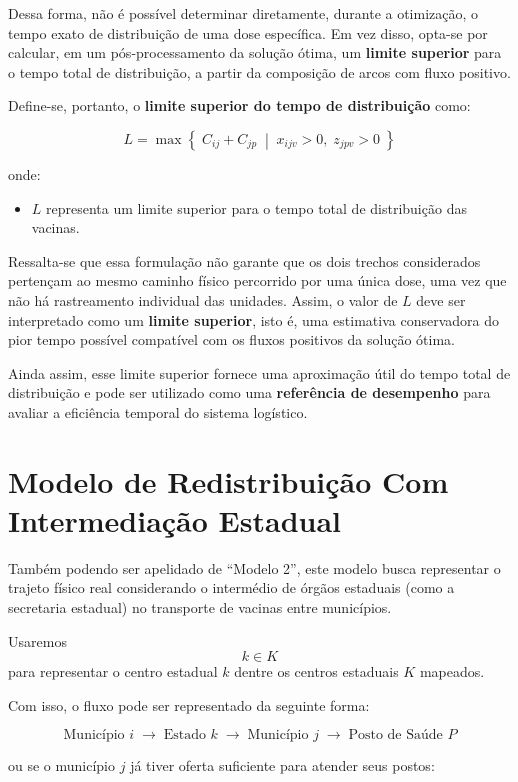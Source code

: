 Dessa forma, não é possível determinar diretamente, durante a otimização, o tempo exato de distribuição de uma dose específica. Em vez disso, opta-se por calcular, em um pós-processamento da solução ótima, um \textbf{limite superior} para o tempo total de distribuição, a partir da composição de arcos com fluxo positivo.

Define-se, portanto, o \textbf{limite superior do tempo de distribuição} como:

\[
L = \max \left\{ \; C_{ij} + C_{jp} 
\;\middle|\;
x_{ijv} > 0,\; z_{jpv} > 0
\; \right\}
\]

onde:
\begin{itemize}
    \item $L$ representa um limite superior para o tempo total de distribuição das vacinas.
\end{itemize}

Ressalta-se que essa formulação não garante que os dois trechos considerados pertençam ao mesmo caminho físico percorrido por uma única dose, uma vez que não há rastreamento individual das unidades. Assim, o valor de $L$ deve ser interpretado como um \textbf{limite superior}, isto é, uma estimativa conservadora do pior tempo possível compatível com os fluxos positivos da solução ótima.

Ainda assim, esse limite superior fornece uma aproximação útil do tempo total de distribuição e pode ser utilizado como uma \textbf{referência de desempenho} para avaliar a eficiência temporal do sistema logístico.

\bigskip


\section{Modelo de Redistribuição Com Intermediação Estadual}

Também podendo ser apelidado de ``Modelo 2'', este modelo busca representar o trajeto físico real considerando o intermédio de órgãos estaduais (como a secretaria estadual) no transporte de vacinas entre municípios.

Usaremos
\[ k \in K \]
para representar o centro estadual $k$ dentre os centros estaduais $K$ mapeados.

Com isso, o fluxo pode ser representado da seguinte forma:

\[
\text{Município } i \;\longrightarrow\; \text{Estado } k \;\longrightarrow\; \text{Município } j \;\longrightarrow\; \text{Posto de Saúde } P
\]

ou se o município $j$ já tiver oferta suficiente para atender seus postos:


